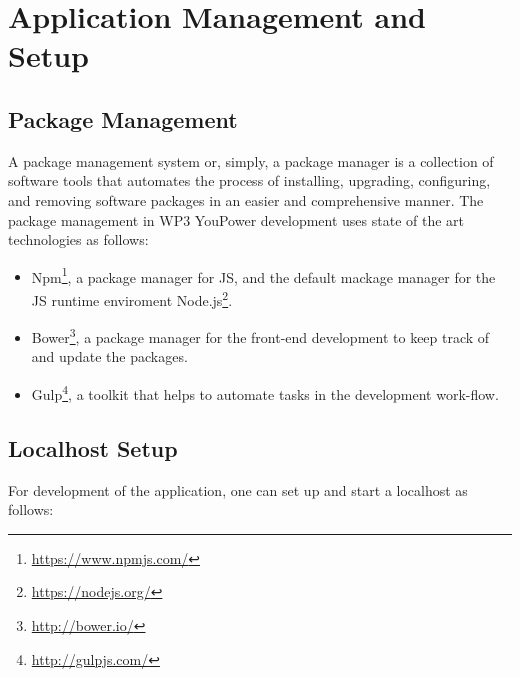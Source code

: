 \section{Application Management and Setup}
\label{sec:setup}

\subsection{Package Management}

A package management system or, simply, a package manager is a collection of software tools that automates the process of installing, upgrading, configuring, and removing software packages in an easier and comprehensive manner. 
The package management in WP3 YouPower development uses state of the art technologies as follows: 

\begin{itemize}
\item Npm\footnote{\url{https://www.npmjs.com/}}, a package manager for JS,  and the default mackage manager for the JS runtime enviroment Node.js\footnote{\url{https://nodejs.org/}}. 

\item Bower\footnote{\url{http://bower.io/}}, a package manager for the front-end development to keep track of and update the packages. 

\item Gulp\footnote{\url{http://gulpjs.com/}}, a toolkit that helps to automate tasks in the development work-flow. 

\end{itemize}

\subsection{Localhost Setup}

For development of the application, one can set up and start a localhost as follows: 

